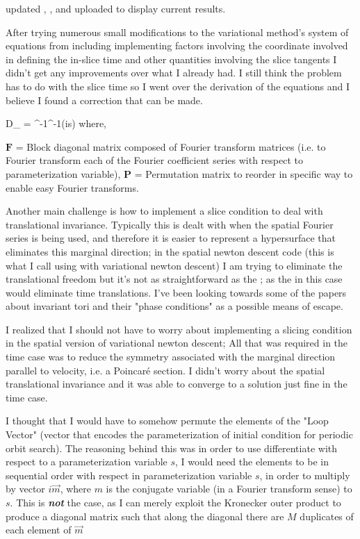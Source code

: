 updated , , and uploaded  to display
current results.

After trying numerous small modifications to the variational method's system
of equations from  including implementing factors involving
the coordinate involved in defining the in-slice time and other quantities
involving the slice tangents I didn't get any improvements over what I already
had. I still think the problem has to do with the slice time so I went over
the derivation of the equations and I believe I found a correction that can be
made.

\beq \nonumber
D_{} = ^{-1}^{-1}(is) \quad
    \mbox{where,}
\label{e-FvndBAD}
\eeq

$\mathbf{F}$ = Block diagonal matrix composed of Fourier transform matrices (i.e. to Fourier transform each
of the Fourier coefficient series with respect to parameterization variable), $\mathbf{P}$ = Permutation matrix
to reorder in specific way to enable easy Fourier transforms.

Another main challenge is how to implement a slice condition to deal with translational
invariance. Typically this is dealt with when the spatial Fourier series is being used, and
therefore it is easier to represent a hypersurface that eliminates this marginal direction; in
the spatial {newton descent} code (this is what I call using  with variational
{newton descent}) I am trying to eliminate the translational freedom but it's not as straightforward as
the {\fFslice}; as the {\fFslice} in this case would eliminate time translations.
I've been looking towards some of the papers about invariant tori and their "phase conditions" as a
possible means of escape.

I realized that I should not have to worry about implementing a slicing condition
in the spatial version of variational {newton descent}; All that was required in the
time case was to reduce the symmetry associated with the marginal direction parallel to
velocity, i.e. a Poincar\'e section. I didn't worry about the spatial translational invariance
and it was able to converge to a solution just fine in the time case.

I thought that I would have to somehow permute the elements  of the "Loop Vector" (vector that
encodes the parameterization of initial condition for periodic orbit search). The reasoning behind this
was in order to use differentiate with respect to a parameterization variable $s$, I would need
the elements to be in sequential order with respect in parameterization variable $s$, in order to
multiply by vector $i \vec{m}$, where $m$ is the conjugate variable (in a Fourier transform sense)
to $s$. This is \textbf{\emph{not}}
the case, as I can merely exploit the Kronecker outer product to produce a diagonal matrix such that
along the diagonal there are $M$ duplicates of each element of $\vec{m}$

